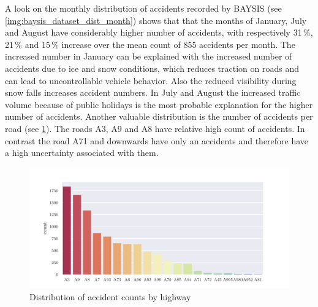 A look on the monthly distribution of accidents recorded by BAYSIS (see \cref{img:baysis_dataset_dist_month}) shows that that the months of January, July and August have considerably higher number of accidents, with respectively 31\,\%, 21\,\% and 15\,\% increase over the mean count of 855 accidents per month. The increased number in January can be explained with the increased number of accidents due to ice and snow conditions, which reduces traction on roads and can lead to uncontrollable vehicle behavior. Also the reduced visibility during snow falls increases accident numbers. In July and August the increased traffic volume because of public holidays is the most probable explanation for the higher number of accidents. Another valuable distribution is the number of accidents per road (see \cref{img:baysis_dataset_dist_highway}). The roads A3, A9 and A8 have relative high count of accidents. In contrast the road A71 and downwards have only an accidents and therefore have a high uncertainty associated with them. 

\begin{figure}[ht]
	\centering
	\includegraphics[scale=0.75]{CorrAnalysis/data/BAYSIS/01_dataset/plots/baysis_dataset_hist_highway}
	\caption{Distribution of accident counts by highway}
	\label{img:baysis_dataset_dist_highway}
	\vspace{-8mm}
\end{figure}

